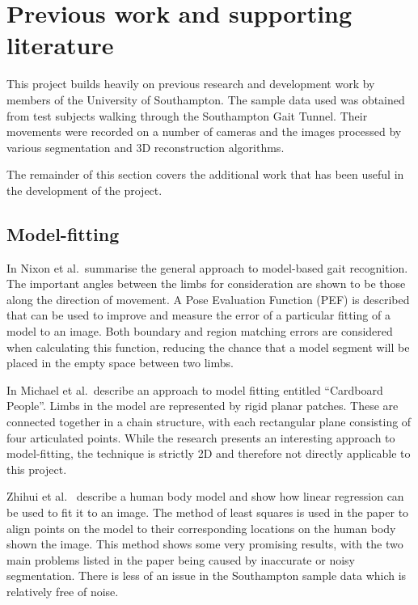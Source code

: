 \section{Previous work and supporting literature}

This project builds heavily on previous research and development work by members of the University of Southampton.
The sample data used was obtained from test subjects walking through the Southampton Gait Tunnel.
Their movements were recorded on a number of cameras and the images processed by various segmentation and 3D reconstruction algorithms.

The remainder of this section covers the additional work that has been useful in the development of the project.

\subsection{Model-fitting}

In \cite{GaitBook} Nixon et al.\ summarise the general approach to model-based gait recognition.
The important angles between the limbs for consideration are shown to be those along the direction of movement.
A Pose Evaluation Function (PEF) is described that can be used to improve and measure the error of a particular fitting of a model to an image.
Both boundary and region matching errors are considered when calculating this function, reducing the chance that a model segment will be placed in the empty space between two limbs.

\bigskip
\noindent In \cite{cardboardpeople} Michael et al.\ describe an approach to model fitting entitled ``Cardboard People''.
Limbs in the model are represented by rigid planar patches.
These are connected together in a chain structure, with each rectangular plane consisting of four articulated points.
While the research presents an interesting approach to model-fitting, the technique is strictly 2D and therefore not directly applicable to this project.

\bigskip
\noindent Zhihui et al.\ \cite{LinearModelFitting} describe a human body model and show how linear regression can be used to fit it to an image.
The method of least squares is used in the paper to align points on the model to their corresponding locations on the human body shown the image.
This method shows some very promising results, with the two main problems listed in the paper being caused by inaccurate or noisy segmentation.
There is less of an issue in the Southampton sample data which is relatively free of noise.

